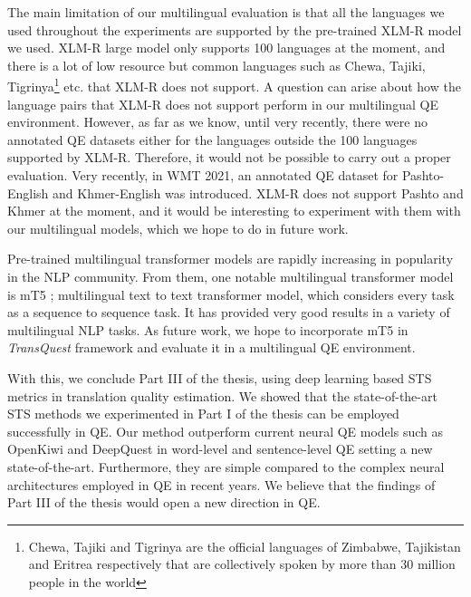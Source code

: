 The main limitation of our multilingual evaluation is that all the languages we used throughout the experiments are supported by the pre-trained XLM-R model we used. XLM-R large model only supports 100 languages at the moment, and there is a lot of low resource but common languages such as Chewa, Tajiki, Tigrinya\footnote{Chewa, Tajiki and Tigrinya are the official languages of Zimbabwe, Tajikistan and Eritrea respectively that are collectively spoken by more than 30 million people in the world} etc. that XLM-R does not support. A question can arise about how the language pairs that XLM-R does not support perform in our multilingual QE environment. However, as far as we know, until very recently, there were no annotated QE datasets either for the languages outside the 100 languages supported by XLM-R. Therefore, it would not be possible to carry out a proper evaluation. Very recently, in WMT 2021, an annotated QE dataset for Pashto-English and Khmer-English was introduced. XLM-R does not support Pashto and Khmer at the moment, and it would be interesting to experiment with them with our multilingual models, which we hope to do in future work.

Pre-trained multilingual transformer models are rapidly increasing in popularity in the NLP community. From them, one notable multilingual transformer model is mT5 \autocite{xue-etal-2021-mt5}; multilingual text to text transformer model, which considers every task as a sequence to sequence task. It has provided very good results in a variety of multilingual NLP tasks. As future work, we hope to incorporate mT5 in \textit{TransQuest} framework and evaluate it in a multilingual QE environment.

With this, we conclude Part III of the thesis, using deep learning based STS metrics in translation quality estimation. We showed that the state-of-the-art STS methods we experimented in Part I of the thesis can be employed successfully in QE. Our method outperform current neural QE models such as OpenKiwi and DeepQuest in word-level and sentence-level QE setting a new state-of-the-art. Furthermore, they are simple compared to the complex neural architectures employed in QE in recent years. We believe that the findings of Part III of the thesis would open a new direction in QE.


